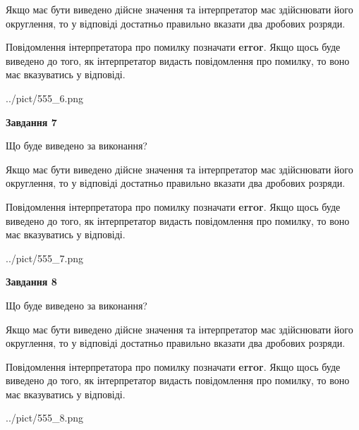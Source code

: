 \documentclass[12pt, ukrainian]{article}
\begin{document}
{\begin {Large}
Якщо має бути виведено дійсне значення та інтерпретатор має здійснювати його округлення, 
то у відповіді достатньо правильно вказати два дробових розряди.

Повідомлення інтерпретатора про помилку позначати \textbf{error}.
Якщо щось буде виведено до того, як інтерпретатор видасть повідомлення про помилку, 
то воно має вказуватись у відповіді. \par

\begin{center}
	{../pict/555_6.png}
\end{center}
\newpage

{\begin {center}\textbf{Завдання 7}\end {center}}\par
Що буде виведено за виконання? \par

Якщо має бути виведено дійсне значення та інтерпретатор має здійснювати його округлення, 
то у відповіді достатньо правильно вказати два дробових розряди.

Повідомлення інтерпретатора про помилку позначати \textbf{error}.
Якщо щось буде виведено до того, як інтерпретатор видасть повідомлення про помилку, 
то воно має вказуватись у відповіді. \par

\begin{center}
	{../pict/555_7.png}
\end{center}
\newpage

{\begin {center}\textbf{Завдання 8}\end {center}}\par
Що буде виведено за виконання? \par

Якщо має бути виведено дійсне значення та інтерпретатор має здійснювати його округлення, 
то у відповіді достатньо правильно вказати два дробових розряди.

Повідомлення інтерпретатора про помилку позначати \textbf{error}.
Якщо щось буде виведено до того, як інтерпретатор видасть повідомлення про помилку, 
то воно має вказуватись у відповіді. \par

\begin{center}
	{../pict/555_8.png}
\end{center}
\newpage


\end{Large}}
\end{document}
